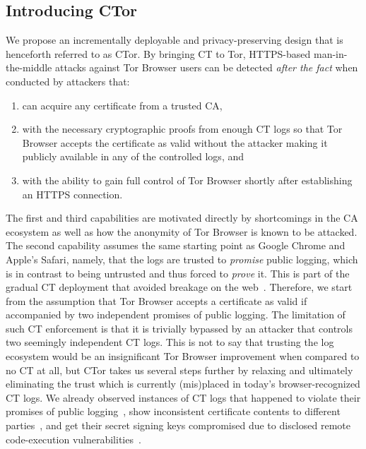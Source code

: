\subsection{Introducing CTor}
We propose an incrementally deployable and privacy-preserving design that is
henceforth referred to as CTor.  By bringing CT to Tor, HTTPS-based
man-in-the-middle attacks against Tor Browser users can be detected \emph{after
the fact} when conducted by attackers that:
\begin{enumerate}
	\item can acquire any certificate from a trusted CA,
	\item with the necessary cryptographic proofs from enough CT logs so that
		Tor Browser accepts the certificate as valid without the attacker
		making it publicly available in any of the controlled logs, and
	\item with the ability to gain full control of Tor Browser shortly after
		establishing an HTTPS connection.
\end{enumerate}

The first and third capabilities are motivated directly by shortcomings in the
CA ecosystem as well as how the anonymity of Tor Browser is known to be
attacked.  The second capability assumes the same starting point as Google
Chrome and Apple's Safari, namely, that the logs are trusted to \emph{promise}
public logging, which is in contrast to being untrusted and thus forced to
\emph{prove} it.  This is part of the gradual CT deployment that avoided
breakage on the web~\cite{does-ct-break-the-web}.  Therefore, we start
from the assumption that Tor Browser accepts a certificate as valid if 
accompanied by two independent promises of public logging.  The limitation of
such CT enforcement is that it is trivially bypassed by an attacker that
controls two seemingly independent CT logs.  This is not to say that trusting
the log ecosystem would be an insignificant Tor Browser improvement when
compared to no CT at all, but CTor takes us several steps further by relaxing
and ultimately eliminating the trust which is currently (mis)placed in today's
browser-recognized CT logs.
We already observed instances of CT logs that happened to
	violate their promises of public logging~\cite{gdca1-omission},
	show inconsistent certificate contents to different
		parties~\cite{izenpe-disqualified,venafi-disqualified}, and
	get their secret signing keys compromised due to disclosed remote
		code-execution vulnerabilities~\cite{digicert-log-compromised}. 

